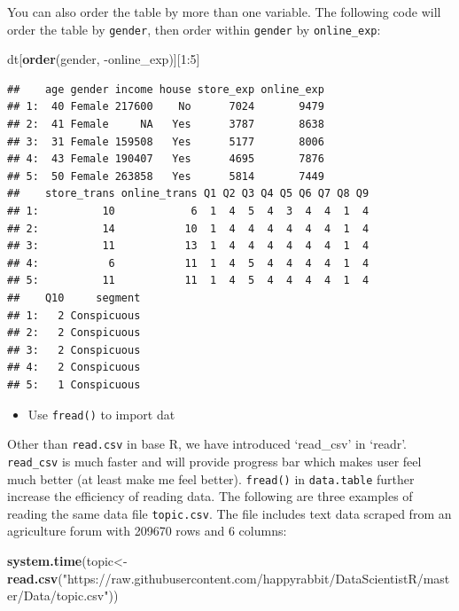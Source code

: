 \documentclass[12pt,]{krantz}
\newenvironment{Shaded}{\begin{snugshade}}{\end{snugshade}}
\newcommand{\KeywordTok}[1]{\textcolor[rgb]{0.13,0.29,0.53}{\textbf{{#1}}}}
\newcommand{\DecValTok}[1]{\textcolor[rgb]{0.00,0.00,0.81}{{#1}}}
\newcommand{\StringTok}[1]{\textcolor[rgb]{0.31,0.60,0.02}{{#1}}}
\newcommand{\NormalTok}[1]{{#1}}
\providecommand{\tightlist}{%
  \setlength{\itemsep}{0pt}\setlength{\parskip}{0pt}}
\theoremstyle{definition}
\theoremstyle{definition}
\theoremstyle{remark}
\begin{document}
You can also order the table by more than one variable. The following
code will order the table by \texttt{gender}, then order within
\texttt{gender} by \texttt{online\_exp}:

\begin{Shaded}
\begin{Highlighting}[]
\NormalTok{dt[}\KeywordTok{order}\NormalTok{(gender, -online_exp)][}\DecValTok{1}\NormalTok{:}\DecValTok{5}\NormalTok{]}
\end{Highlighting}
\end{Shaded}

\begin{verbatim}
##    age gender income house store_exp online_exp
## 1:  40 Female 217600    No      7024       9479
## 2:  41 Female     NA   Yes      3787       8638
## 3:  31 Female 159508   Yes      5177       8006
## 4:  43 Female 190407   Yes      4695       7876
## 5:  50 Female 263858   Yes      5814       7449
##    store_trans online_trans Q1 Q2 Q3 Q4 Q5 Q6 Q7 Q8 Q9
## 1:          10            6  1  4  5  4  3  4  4  1  4
## 2:          14           10  1  4  4  4  4  4  4  1  4
## 3:          11           13  1  4  4  4  4  4  4  1  4
## 4:           6           11  1  4  5  4  4  4  4  1  4
## 5:          11           11  1  4  5  4  4  4  4  1  4
##    Q10     segment
## 1:   2 Conspicuous
## 2:   2 Conspicuous
## 3:   2 Conspicuous
## 4:   2 Conspicuous
## 5:   1 Conspicuous
\end{verbatim}

\begin{itemize}
\tightlist
\item
  Use \texttt{fread()} to import dat
\end{itemize}

Other than \texttt{read.csv} in base R, we have introduced `read\_csv'
in `readr'. \texttt{read\_csv} is much faster and will provide progress
bar which makes user feel much better (at least make me feel better).
\texttt{fread()} in \texttt{data.table} further increase the efficiency
of reading data. The following are three examples of reading the same
data file \texttt{topic.csv}. The file includes text data scraped from
an agriculture forum with 209670 rows and 6 columns:

\begin{Shaded}
\begin{Highlighting}[]
\KeywordTok{system.time}\NormalTok{(topic<-}\KeywordTok{read.csv}\NormalTok{(}\StringTok{"https://raw.githubusercontent.com/happyrabbit/DataScientistR/master/Data/topic.csv"}\NormalTok{))}
\end{Highlighting}
\end{Shaded}
\end{document}
